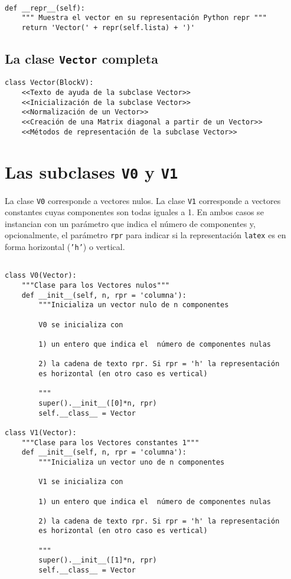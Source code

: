 \documentclass[11pt]{report}
\begin{document}
\begin{verbatim}

def __repr__(self):
    """ Muestra el vector en su representación Python repr """
    return 'Vector(' + repr(self.lista) + ')'

\end{verbatim}
\section{La clase \texttt{Vector} completa}
\label{sec:org677238c}

\begin{verbatim}
class Vector(BlockV):
    <<Texto de ayuda de la subclase Vector>>
    <<Inicialización de la subclase Vector>>
    <<Normalización de un Vector>>
    <<Creación de una Matrix diagonal a partir de un Vector>>
    <<Métodos de representación de la subclase Vector>>
\end{verbatim}


\chapter{Las subclases \texttt{V0} y \texttt{V1}}
\label{sec:org2954361}

La clase \texttt{V0} corresponde a vectores nulos. La clase \texttt{V1} corresponde
a vectores constantes cuyas componentes son todas iguales a 1. En
ambos casos se instancian con un parámetro que indica el número de
componentes y, opcionalmente, el parámetro \texttt{rpr} para indicar si la
representación \texttt{latex} es en forma horizontal (\texttt{'h'}) o vertical.

\begin{verbatim}

class V0(Vector):
    """Clase para los Vectores nulos"""
    def __init__(self, n, rpr = 'columna'):
        """Inicializa un vector nulo de n componentes

        V0 se inicializa con

        1) un entero que indica el  número de componentes nulas
    
        2) la cadena de texto rpr. Si rpr = 'h' la representación
        es horizontal (en otro caso es vertical)

        """
        super().__init__([0]*n, rpr)
        self.__class__ = Vector

class V1(Vector):
    """Clase para los Vectores constantes 1"""
    def __init__(self, n, rpr = 'columna'):
        """Inicializa un vector uno de n componentes

        V1 se inicializa con

        1) un entero que indica el  número de componentes nulas
    
        2) la cadena de texto rpr. Si rpr = 'h' la representación
        es horizontal (en otro caso es vertical)

        """
        super().__init__([1]*n, rpr)
        self.__class__ = Vector

\end{verbatim}
\end{document}
